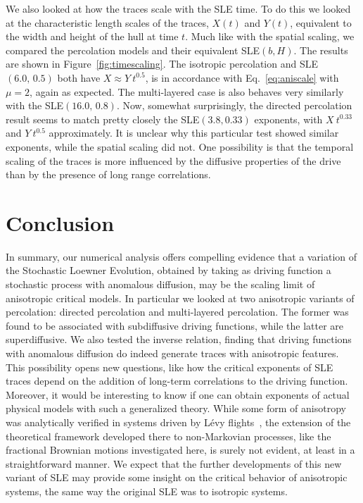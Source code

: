 We also looked at how the traces scale with the SLE time. To do this we looked
at the characteristic length scales of the traces, $X(t)$ and $Y(t)$,
equivalent to the width and height of the hull at time $t$. Much like with the
spatial scaling, we compared the percolation models and their equivalent
SLE$(b,H)$. The results are shown in Figure~\ref{fig:timescaling}. The
isotropic percolation and SLE$(6.0,\, 0.5)$ both have $X\approx Y~t^{0.5}$, is
in accordance with Eq.~\ref{eq:aniscale} with $\mu=2$, again as expected. The
multi-layered case is also behaves very similarly with the SLE$(16.0,\,0.8)$.
Now, somewhat surprisingly, the directed percolation result seems to match
pretty closely the SLE$(3.8, 0.33)$ exponents, with $X~t^{0.33}$ and
$Y~t^{0.5}$ approximately. It is unclear why this particular test showed
similar exponents, while the spatial scaling did not. One possibility is that
the temporal scaling of the traces is more influenced by the diffusive
properties of the drive than by the presence of long range correlations.


\section{Conclusion}
\label{sec:concl}

In summary, our numerical analysis offers compelling evidence that a variation
of the Stochastic Loewner Evolution, obtained by taking as driving function a
stochastic process with anomalous diffusion, may be the scaling limit of
anisotropic critical models. In particular we looked at two anisotropic
variants of percolation: directed percolation and multi-layered percolation.
The former was found to be associated with subdiffusive driving functions,
while the latter are superdiffusive. We also tested the inverse relation,
finding that driving functions with anomalous diffusion do indeed generate
traces with anisotropic features.  This possibility opens new questions, like
how the critical exponents of SLE traces depend on the addition of long-term
correlations to the driving function. Moreover, it would be interesting to know
if one can obtain exponents of actual physical models with such a generalized
theory. While some form of anisotropy was analytically verified in systems
driven by L\'evy flights~\cite{Oikonomou2008}, the extension of the theoretical
framework developed there to non-Markovian processes, like the fractional
Brownian motions investigated here, is surely not evident, at least in a
straightforward manner. We expect that the further developments of this new
variant of SLE may provide some insight on the critical behavior of anisotropic
systems, the same way the original SLE was to isotropic systems.




